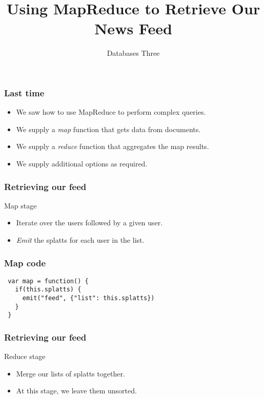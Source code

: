 \documentclass[10pt]{beamer}
\title{Using MapReduce to Retrieve Our News Feed}
\author[IN705]{Databases Three}
\institute[Otago Polytechnic]{
  Otago Polytechnic \\
  Dunedin, New Zealand \\
}
\date{}
\begin{document}
\begin{frame}[plain]
  \titlepage
\end{frame}



\begin{frame}
  \frametitle{Last time}

 \begin{itemize}
  \item We saw how to use MapReduce to perform complex queries.
  \item We supply a \emph{map} function that gets data from documents.
  \item We supply a \emph{reduce} function that aggregates the map results.
  \item We supply additional options as required.
 \end{itemize}

\end{frame}


\begin{frame}
  \frametitle{Retrieving our feed}

 Map stage
 \begin{itemize}
	 \item Iterate over the users followed by a given user.
         \item \emph{Emit} the splatts for each user in the list.
 \end{itemize}

\end{frame}


\begin{frame}[fragile]
  \frametitle{Map code}

 \begin{verbatim}
 var map = function() {
   if(this.splatts) {
     emit("feed", {"list": this.splatts})
   }
 }
 \end{verbatim}

\end{frame}


\begin{frame}
  \frametitle{Retrieving our feed}
 Reduce stage
 \begin{itemize}
  \item Merge our lists of splatts together.
  \item At this stage, we leave them unsorted.
 \end{itemize}

\end{frame}
\end{document}
